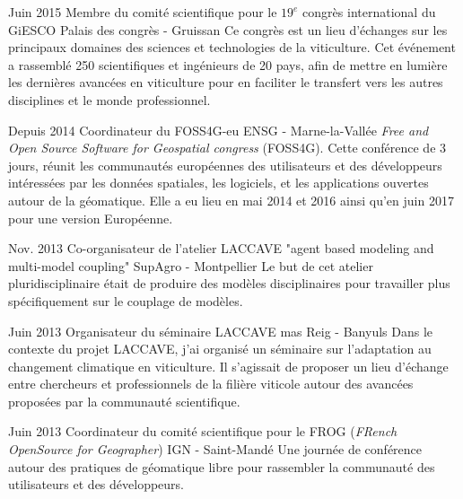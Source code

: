 \documentclass[]{cv-etienne}
\begin{document}
\begin{entrylist}
\entry
{Juin 2015}
{Membre du comité scientifique pour le $19^{e}$ congrès international du GiESCO}
{Palais des congrès - Gruissan}
{Ce congrès est un lieu d'échanges sur les principaux domaines des sciences et technologies de la viticulture. Cet événement a rassemblé 250 scientifiques et ingénieurs de 20 pays, afin de mettre en lumière les dernières avancées en viticulture pour en faciliter le transfert vers les autres disciplines et le monde professionnel.}
\end{entrylist}
\begin{entrylist}
\entry
{Depuis 2014}
{Coordinateur du FOSS4G-eu}
{ENSG - Marne-la-Vallée}
{\emph{Free and Open Source Software for Geospatial congress} (FOSS4G). Cette conférence de 3 jours, réunit les communautés européennes des utilisateurs et des développeurs intéressées par les données spatiales, les logiciels, et les applications ouvertes autour de la géomatique. Elle a eu lieu en mai 2014 et 2016 ainsi qu'en juin 2017 pour une version Européenne.}
\end{entrylist}
\begin{entrylist}
\entry
{Nov. 2013}
{Co-organisateur de l'atelier LACCAVE "agent based modeling and  multi-model coupling"}
{SupAgro - Montpellier}
{Le but de cet atelier pluridisciplinaire était de produire des modèles disciplinaires pour travailler plus spécifiquement sur le couplage de modèles.}
\end{entrylist}
\begin{entrylist}
\entry
{Juin 2013}
{Organisateur du séminaire LACCAVE}
{mas Reig - Banyuls}
{Dans le contexte du projet LACCAVE, j'ai organisé un séminaire sur l'adaptation au changement climatique en viticulture. Il s'agissait de proposer un lieu d'échange entre chercheurs et professionnels de la filière viticole autour des avancées proposées par la communauté scientifique.}
\end{entrylist}
\begin{entrylist}
\entry
{Juin 2013}
{Coordinateur du comité scientifique pour le FROG  (\emph{FRench OpenSource for Geographer})}
{IGN - Saint-Mandé}
{Une journée de conférence autour des pratiques de géomatique libre pour rassembler la communauté des utilisateurs et des développeurs.}
\end{entrylist}
\end{document}
